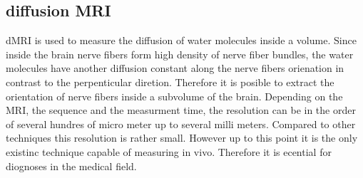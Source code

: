 \subsection{diffusion MRI}
% 
\ac{dMRI} is used to measure the diffusion of water molecules inside a volume.
Since inside the brain nerve fibers form high density of nerve fiber bundles, the water molecules have another diffusion constant along the nerve fibers orienation in contrast to the perpenticular diretion.
Therefore it is posible to extract the orientation of nerve fibers inside a subvolume of the brain.
Depending on the \ac{MRI}, the sequence and the measurment time, the resolution can be in the order of several hundres of micro meter up to several milli meters.
Compared to other techniques this resolution is rather small. 
However up to this point it is the only existinc technique capable of measuring in vivo.
Therefore it is ecential for diognoses in the medical field.
% 
% 
% 
